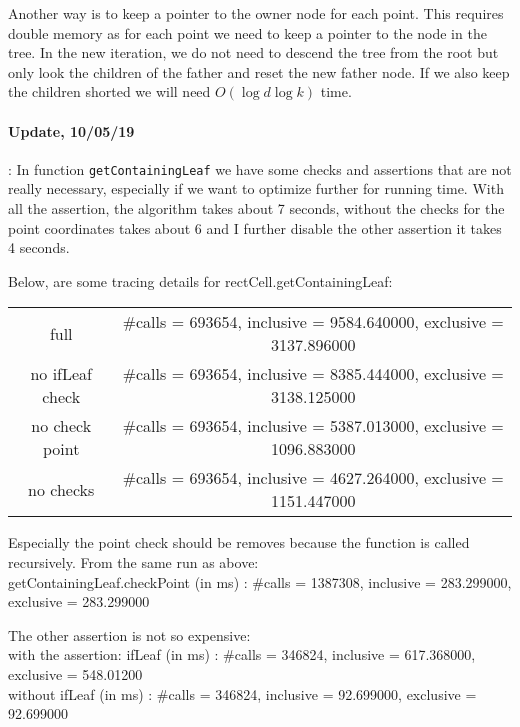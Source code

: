 \documentclass[a4paper,10pt]{article}
\begin{document}
Another way is to keep a pointer to the owner node for each point. This requires double memory as for each point we need to keep a pointer to the node in the tree. In the new iteration, we do not need to descend the tree from the root but only look the children of the father and reset the new father node. If we also keep the children shorted we will need $O(\log d \log k)$ time. 

\paragraph*{Update, 10/05/19}: In function \texttt{getContainingLeaf} we have some checks and assertions
that are not really necessary, especially if we want to optimize further for running time.
With all the assertion, the algorithm takes about 7 seconds, without the checks for the point
coordinates takes about 6 and I further disable the other assertion it takes 4 seconds.

Below, are some tracing details for rectCell.getContainingLeaf:

\begin{tabular}{c|c}
full & \#calls = 693654, inclusive = 9584.640000, exclusive = 3137.896000 \\
no ifLeaf check & \#calls = 693654, inclusive = 8385.444000, exclusive = 3138.125000 \\
no check point & \#calls = 693654, inclusive = 5387.013000, exclusive = 1096.883000 \\
no checks & \#calls = 693654, inclusive = 4627.264000, exclusive = 1151.447000
\end{tabular}

Especially the point check should be removes because the function is called recursively. From the 
same run as above:\\
getContainingLeaf.checkPoint (in ms) : \#calls = 1387308, inclusive = 283.299000, exclusive = 283.299000

The other assertion is not so expensive:\\
with the assertion: ifLeaf (in ms) : \#calls = 346824, inclusive = 617.368000, exclusive = 548.01200\\
without ifLeaf (in ms) : \#calls = 346824, inclusive = 92.699000, exclusive = 92.699000
\end{document}
